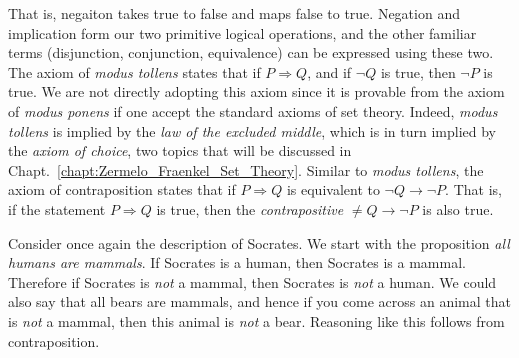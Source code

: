         That is, negaiton takes true to false and maps false to true. Negation
        and implication form our two primitive logical operations, and the other
        familiar terms (disjunction, conjunction, equivalence) can be expressed
        using these two. The axiom of \textit{modus tollens} states that if
        $P\Rightarrow{Q}$, and if $\neg{Q}$ is true, then $\neg{P}$ is true. We
        are not directly adopting this axiom since it is provable from the
        axiom of \textit{modus ponens} if one accept the standard axioms of set
        theory. Indeed, \textit{modus tollens} is implied by the
        \textit{law of the excluded middle},
        which is in turn implied by the
        \textit{axiom of choice}, two topics that will be
        discussed in Chapt.~\ref{chapt:Zermelo_Fraenkel_Set_Theory}. Similar to
        \textit{modus tollens}, the axiom of contraposition states that if
        $P\Rightarrow{Q}$ is equivalent to $\neg{Q}\rightarrow\neg{P}$. That is,
        if the statement $P\Rightarrow{Q}$ is true, then the
        \textit{contrapositive}
        $\neq{Q}\rightarrow\neg{P}$ is also true.
        \begin{example}
            Consider once again the description of Socrates. We start with the
            proposition \textit{all humans are mammals}. If Socrates is a human,
            then Socrates is a mammal. Therefore if Socrates is \textit{not} a
            mammal, then Socrates is \textit{not} a human. We could also say
            that all bears are mammals, and hence if you come across an animal
            that is \textit{not} a mammal, then this animal is \textit{not} a
            bear. Reasoning like this follows from contraposition.
        \end{example}
